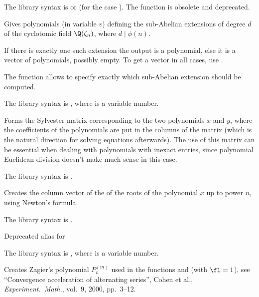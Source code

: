 The library syntax is  or
 (for the case ). The function
 is obsolete and deprecated.

\label{se:polsubcyclo}
Gives polynomials (in variable $v$) defining the sub-Abelian extensions
of degree $d$ of the cyclotomic field $\Q(\zeta_n)$, where $d\mid \phi(n)$.

If there is exactly one such extension the output is a polynomial, else it is
a vector of polynomials, possibly empty. To get a vector in all cases,
use .

The function  allows to specify exactly which
sub-Abelian extension should be computed.

The library syntax is , where  is a variable number.

\label{se:polsylvestermatrix}
Forms the Sylvester matrix
corresponding to the two polynomials $x$ and $y$, where the coefficients of
the polynomials are put in the columns of the matrix (which is the natural
direction for solving equations afterwards). The use of this matrix can be
essential when dealing with polynomials with inexact entries, since
polynomial Euclidean division doesn't make much sense in this case.

The library syntax is .

\label{se:polsym}
Creates the column vector of the  of the roots of the
polynomial $x$ up to power $n$, using Newton's formula.

The library syntax is .

\label{se:poltchebi}
Deprecated alias for 

The library syntax is , where  is a variable number.

\label{se:polzagier}
Creates Zagier's polynomial $P_n^{(m)}$ used in
the functions  and  (with $\fl=1$), see
``Convergence acceleration of alternating series'', Cohen et al.,
\emph{Experiment.~Math.}, vol.~9, 2000, pp.~3--12.

